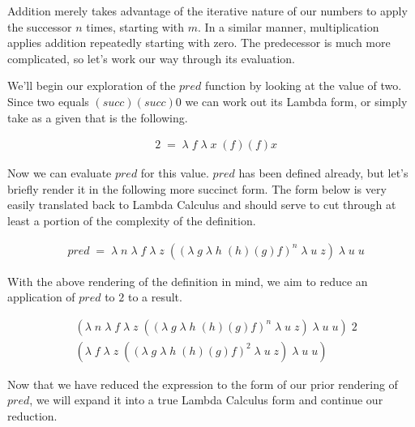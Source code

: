 Addition merely takes advantage of the iterative nature of our numbers to apply
the successor $n$ times, starting with $m$. In a similar manner, multiplication
applies addition repeatedly starting with zero. The predecessor is much more
complicated, so let's work our way through its evaluation.

We'll begin our exploration of the $pred$ function by looking at the value of two. 
Since two equals $(succ)(succ)0$ we can work out its Lambda form, or simply take
as a given that is the following.

\begin{figure}[htp]
\caption{}\label{scheme}
\begin{align*}
& 2 \; = \; \lambda \; f \; \lambda \; x \; (f)(f)x
\end{align*}
\end{figure}

Now we can evaluate $pred$ for this value. $pred$ has been defined already, but
let's briefly render it in the following more succinct form. The form below is
very easily translated back to Lambda Calculus and should serve to cut through at
least a portion of the complexity of the definition.

\begin{figure}[htp]
\caption{}\label{scheme}
\begin{align*}
& pred \; = \; \lambda \; n \; \lambda \; f \; \lambda \; z \; ((\lambda \; g \; \lambda \; h \; (h)(g)f)^{n} \; \lambda \; u \; z) \; \lambda \; u \; u
\end{align*}
\end{figure}

With the above rendering of the definition in mind, we aim to reduce an
application of $pred$ to $2$ to a result.

\begin{figure}[htp]
\caption{}\label{scheme}
\begin{align*}
& (\lambda \; n \; \lambda \; f \; \lambda \; z \; ((\lambda \; g \; \lambda \; h \; (h)(g)f)^{n} \; \lambda \; u \; z) \; \lambda \; u \; u) \; 2
\\& (\lambda \; f \; \lambda \; z \; ((\lambda \; g \; \lambda \; h \; (h)(g)f)^2 \; \lambda \; u \; z) \; \lambda \; u \; u)
\end{align*}
\end{figure}
Now that we have reduced the expression to the form of our prior rendering of
$pred$, we will expand it into a true Lambda Calculus form and continue our
reduction.


